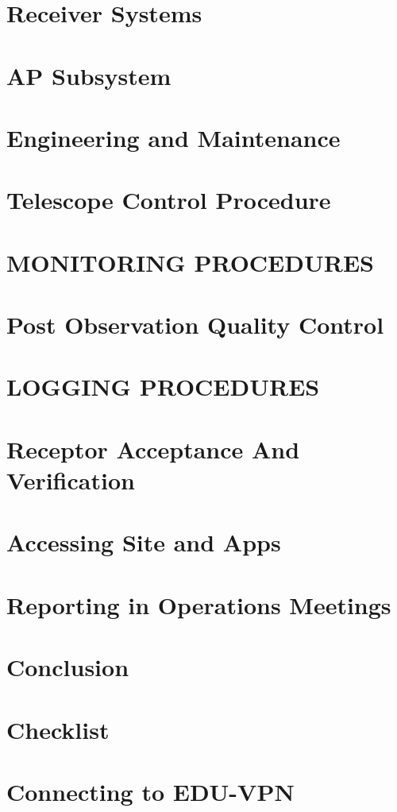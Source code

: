 \documentclass[12pt]{report}
\begin{document}
 
 \chapter{Receiver Systems}
 
 
 \chapter{ AP Subsystem}
 
 
 \chapter{Engineering and Maintenance}
 
\chapter{Telescope Control Procedure}
 
 \chapter{ MONITORING PROCEDURES}
 
 \chapter{Post Observation Quality Control}
 

\chapter{LOGGING PROCEDURES}


\chapter{ Receptor Acceptance And Verification}
 
 
 \chapter{Accessing Site and Apps }
 
 
\chapter{Reporting in Operations Meetings
	 }
	 
 \chapter{Conclusion}
 
 \appendix
 \chapter{Checklist}
 
 
 \chapter{Connecting to EDU-VPN}
  
 

 
\end{document}
